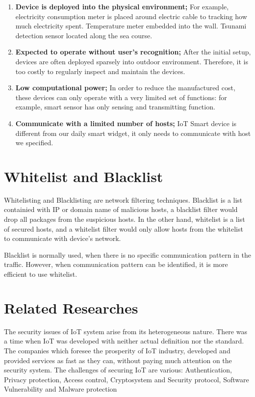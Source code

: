 \begin{enumerate}
    \item \textbf{Device is deployed into the physical environment;}     For example, electricity consumption meter is placed around electric cable to tracking how much electricity spent. Temperature meter embedded into the wall. Tsunami detection sensor located along the sea course. 
    \item \textbf{Expected to operate without user’s recognition;}     After the initial setup, devices are often deployed sparsely into outdoor environment. Therefore, it is too costly to regularly inspect and maintain the devices.  
    \item \textbf{Low computational power;}     In order to reduce the manufactured cost, these devices can only operate with a very limited set of functions: for example, smart sensor has only sensing and transmitting function.  
    \item \textbf{Communicate with a limited number of hosts;} IoT Smart device is different from our daily smart widget, it only needs to communicate with host we specified. 
\end{enumerate}

\section{Whitelist and Blacklist }
Whitelisting and Blacklisting are network filtering techniques. Blacklist is a list containied with IP or domain name of malicious hosts, a blacklist filter would drop all packages from the suspicious hosts. 
In the other hand, whitelist is a list of secured hosts, and a whitelist filter would only allow hosts from the whitelist to communicate with device's network. 

Blacklist is normally used, when there is no specific communication pattern in the traffic.
However, when communication pattern can be identified, it is more efficient to use whitelist.

\section{Related Researches}
The security issues of IoT system arise from its heterogeneous nature. There was a time when IoT was developed with neither actual definition nor the standard. The companies which foresee the prosperity of IoT industry, developed and provided services as fast as they can, without paying much attention on the security system. The challenges of securing IoT are various: Authentication, Privacy protection, Access control, Cryptosystem and Security protocol, Software Vulnerability and Malware protection \cite{ISSUE1}\cite{ISSUE2} 


